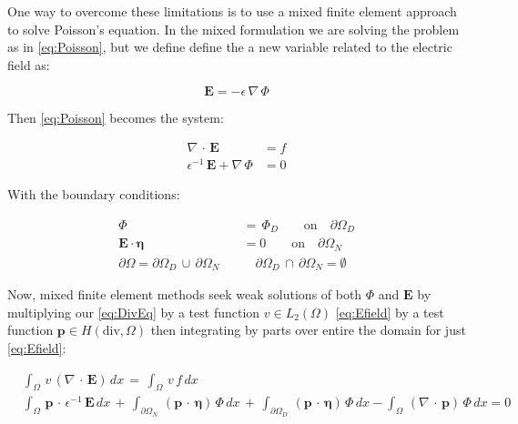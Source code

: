 \documentclass[10pt]{report}
\numberwithin{equation}{section}
\begin{document}
\vspace{3mm}


\noindent
One way to overcome these limitations is to use a mixed finite element approach to solve Poisson's equation.  In the mixed formulation we are solving the problem as in \eqref{eq:Poisson}, but we define define the a new variable related to the electric field as:


$$ \textbf{E}= -\epsilon \, \nabla \, \Phi $$


\noindent
Then \eqref{eq:Poisson} becomes the system:


\begin{align}
\nabla \, \cdot \, \textbf{E} \, &= f \label{eq:DivEq}\\
\epsilon^{-1} \, \textbf{E} + \nabla \, \Phi &= 0 \label{eq:Efield}
\end{align}


\noindent
With the boundary conditions:


\begin{align}
\Phi \, &= \, \Phi_{D} \qquad \text{on} \quad \partial \Omega_{D} \\ 
\textbf{E} \cdot \boldsymbol \eta &= 0 \qquad \text{on} \quad \partial \Omega_{N} \label{eq:SystemNeumannBC} \\
 \partial \Omega = \partial \Omega_{D} \, \cup \, \partial \Omega_{N} \quad & \quad \partial \Omega_{D} \, \cap \, \partial \Omega_{N} = \emptyset
\end{align}


\vspace{2mm}


\noindent
Now, mixed finite element methods seek weak solutions of both $\Phi$ and $\textbf{E}$ by multiplying our \eqref{eq:DivEq} by a test function $v \in L_{2}(\Omega)$ \eqref{eq:Efield} by a test function $\textbf{p} \in H(\text{div}, \Omega)$ then integrating by parts over entire the domain for just \eqref{eq:Efield}:



  
\begin{align}
&\int_{\Omega}  \, v \, \left( \nabla  \, \cdot \, \textbf{E} \right) \, dx \, =  \, \int_{\Omega}  \,  v \, f \, dx  \\
&\int_{\Omega} \,  \textbf{p} \, \cdot \,  \epsilon^{-1} \, \textbf{E} \, dx \, 
+ \, \int_{\partial \Omega_{N}} \, \left( \textbf{p} \, \cdot \, \boldsymbol \eta \right) \, \Phi  \, dx  \,
+ \, \int_{\partial \Omega_{D}} \, \left( \textbf{p} \, \cdot \, \boldsymbol \eta \right) \, \Phi  \, dx  
-\int_{\Omega} \,  \left(\nabla \, \cdot \, \textbf{p} \right) \, \Phi \, dx = 0
\end{align}
\end{document}
